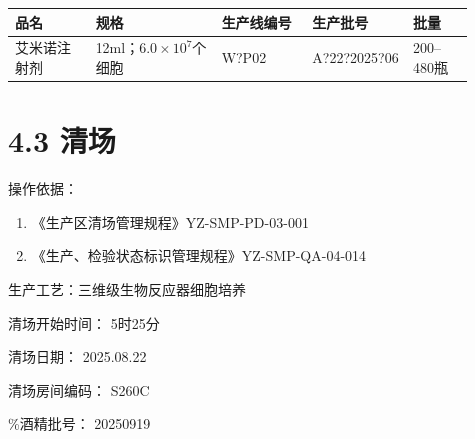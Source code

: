 \documentclass[UTF8,10pt,a4paper,fontset=fandol]{ctexart}
\newcommand{\fieldvalue}[1]{#1}
\newcommand{\handwritten}[1]{#1}
\begin{document}
\begin{center}
\small
\begin{tabular}{|p{0.16\linewidth}|p{0.25\linewidth}|p{0.18\linewidth}|p{0.20\linewidth}|p{0.12\linewidth}|}
\hline
品名 & 规格 & 生产线编号 & 生产批号 & 批量 \\
\hline
\fieldvalue{艾米诺注射剂}
&
\fieldvalue{12ml；$6.0\times10^{7}$个细胞}
&
\fieldvalue{\handwritten{W?P02}}
&
\fieldvalue{\handwritten{A?22?2025?06}}
&
\fieldvalue{200--480瓶}
\\
\hline
\end{tabular}
\end{center}

\section*{4.3 清场}

\noindent 操作依据：

\begin{enumerate}
    \item 《生产区清场管理规程》\hfill YZ-SMP-PD-03-001
    \item 《生产、检验状态标识管理规程》\hfill YZ-SMP-QA-04-014
\end{enumerate}

\noindent
生产工艺：三维级生物反应器细胞培养

\noindent
清场开始时间：
\fieldvalue{\handwritten{5时25分}}

\noindent
清场日期：
\fieldvalue{\handwritten{2025.08.22}}

\noindent
清场房间编码：
\fieldvalue{\handwritten{S260C}}

\%酒精批号：
\fieldvalue{\handwritten{20250919}}
\end{document}
